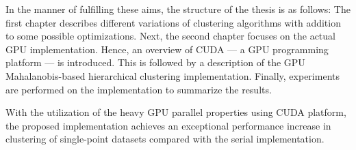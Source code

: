 In the manner of fulfilling these aims, the structure of the thesis is as follows: The first chapter describes different variations of clustering algorithms with addition to some possible optimizations. Next, the second chapter focuses on the actual GPU implementation. Hence, an overview of CUDA --- a GPU programming platform --- is introduced. This is followed by a description of the GPU Mahalanobis-based hierarchical clustering implementation. Finally, experiments are performed on the implementation to summarize the results.

With the utilization of the heavy GPU parallel properties using CUDA platform, the proposed implementation achieves an exceptional performance increase in clustering of single-point datasets compared with the serial implementation.